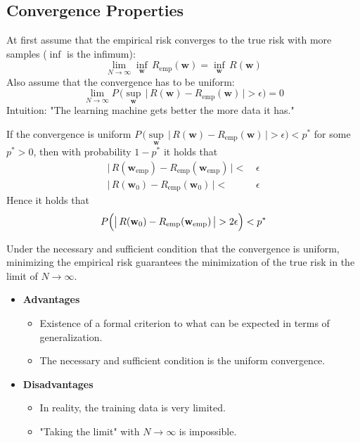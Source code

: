 \documentclass[a4paper, 11pt, accentcolor = tud3b]{tudreport}
\newcommand{\emp}{\textrm{emp}}
\renewcommand{\vec}[1]{\mathbf{#1}}
\begin{document}
			\subsection{Convergence Properties}
				At first assume that the empirical risk converges to the true risk with more samples (\(\inf\) is the infimum):
				\begin{equation}
					\lim\limits_{N \to \infty} \inf\limits_{\vec{w}} \, R_\emp(\vec{w}) = \inf\limits_{\vec{w}} \, R(\vec{w})
				\end{equation}
				Also assume that the convergence has to be uniform:
				\begin{equation}
					\lim\limits_{N \to \infty} P\,\Bigg(\! \sup\limits_{\vec{w}} \, \big\lvert\, R(\vec{w}) - R_\emp(\vec{w}) \,\big\rvert > \epsilon \Bigg) = 0
				\end{equation}
				Intuition: "The learning machine gets better the more data it has."
				
				If the convergence is uniform \( P\,\Bigg(\! \sup\limits_{\vec{w}} \, \big\lvert\, R(\vec{w}) - R_\emp(\vec{w}) \,\big\rvert > \epsilon \Bigg) < p^\ast \) for some \( p^\ast > 0 \), then with probability \( 1 - p^\ast \) it holds that
				\begin{align}
					\big\lvert\, R(\vec{w}_\emp) - R_\emp(\vec{w}_\emp) \,\big\rvert < & \,\epsilon \\
					\big\lvert\, R(\vec{w}_0) - R_\emp(\vec{w}_0) \,\big\rvert <       & \,\epsilon
				\end{align}
				Hence it holds that
				\begin{equation}
					P\Big( \big\lvert\, R(\vec{w}_0) - R_\emp(\vec{w}_\emp) \,\big\rvert > 2\epsilon \Big) < p^\ast \\
				\end{equation}
				
				Under the necessary and sufficient condition that the convergence is uniform, minimizing the empirical risk guarantees the minimization of the true risk in the limit of \( N \to \infty \).
				
				\begin{itemize}
					\item \textbf{Advantages}
						\begin{itemize}
							\item Existence of a formal criterion to what can be expected in terms of generalization.
							\item The necessary and sufficient condition is the uniform convergence.
						\end{itemize}
					\item \textbf{Disadvantages}
						\begin{itemize}
							\item In reality, the training data is very limited.
							\item "Taking the limit" with \( N \to \infty \) is impossible.
						\end{itemize}
				\end{itemize}
\end{document}
